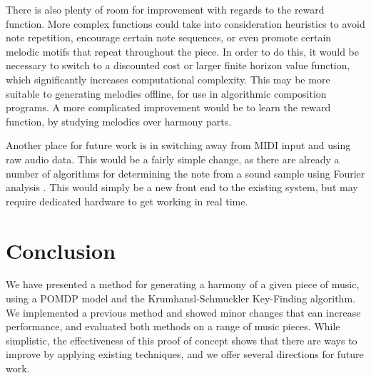 \documentclass[11pt]{article} %
\begin{document}
There is also plenty of room for improvement with regards to the reward function. More complex functions could take into consideration heuristics to avoid note repetition, encourage certain note sequences, or even promote certain melodic motifs that repeat throughout the piece. In order to do this, it would be necessary to switch to a discounted cost or larger finite horizon value function, which significantly increases computational complexity. This may be more suitable to generating melodies offline, for use in algorithmic composition programs. A more complicated improvement would be to learn the reward function, by studying melodies over harmony parts.

Another place for future work is in switching away from MIDI input and using raw audio data. This would be a fairly simple change, as there are already a number of algorithms for determining the note from a sound sample using Fourier analysis \cite{gerhard2003}.
This would simply be a new front end to the existing system, but may require dedicated hardware to get working in real time. 

\section{Conclusion}
We have presented a method for generating a harmony of a given piece of music, using a POMDP model and the Krumhansl-Schmuckler Key-Finding algorithm. We implemented a previous method and showed minor changes that can increase performance, and evaluated both methods on a range of music pieces. While simplistic, the effectiveness of this proof of concept shows that there are ways to improve by applying existing techniques, and we offer several directions for future work.



\end{document}

